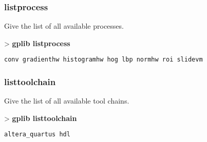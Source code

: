 \documentclass[10pt,a4paper]{article}
\begin{document}
\subsubsection{listprocess}

Give the list of all available processes.

\begin{sampletitle}
> \textbf{gplib listprocess}
\begin{Verbatim}
conv gradienthw histogramhw hog lbp normhw roi slidevm
\end{Verbatim}
\end{sampletitle}

\subsubsection{listtoolchain}

Give the list of all available tool chains.

\begin{sampletitle}
> \textbf{gplib listtoolchain}
\begin{Verbatim}
altera_quartus hdl
\end{Verbatim}
\end{sampletitle}
\end{document}
